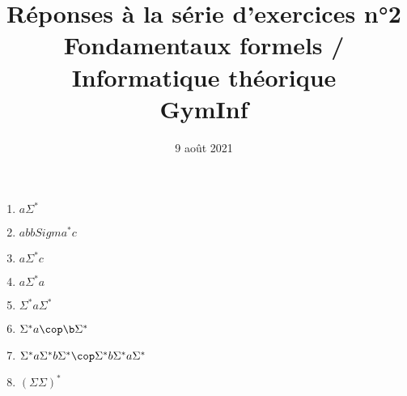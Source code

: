 \documentclass[12pt,french,a4paper]{article}
\begin{document}
\title{\vspace{-2cm}Réponses à la série d'exercices n°2\\\large{Fondamentaux formels / Informatique théorique\\GymInf}}
\date{\vspace{-1cm}9 août 2021}

\maketitle

\begin{question}
\begin{enumerate}
\item $\{a\}$
\item $\{ab\}$
\item $\{a, b\}$
\item $\{aa, ac, ba, bc\}$
\item $\{\epsilon \}$
\item $\{\}$ ou $\emptyset$
\item $\{a, b,\epsilon, aa, aaa, bb, bbb}$
\item $\{a, b, \espilon, aab, aabb, aaab, aaabb, aaabbb \}$
\item $\{\espilon\}$
\item $\{\} U \{\espilon\}=\{\espilon\}$
\end{enumerate}
\end{question}


\begin{question}
\begin{enumerate}
\item $a\Sigma^{*}$
\item $abbSigma^{*}c$
\item $a\Sigma^{*}c$
\item $a\Sigma^{*}a$
\item $\Sigma^{*}a\Sigma^{*}$
\item $\Sigma^{*}a\cop\b \Sigma^{*}$
\item $\Sigma^{*}a\Sigma^{*}b \Sigma^{*}\cop \Sigma^{*}b\Sigma^{*}a \Sigma^{*} $
\item $(\Sigma\Sigma)^{*}$
\end{enumerate}
\end{question}

\begin{question}
\begin{enumerate}

\end{enumerate}
\end{question}

\begin{question}
\begin{enumerate}

\end{enumerate}
\end{question}
\end{document}
